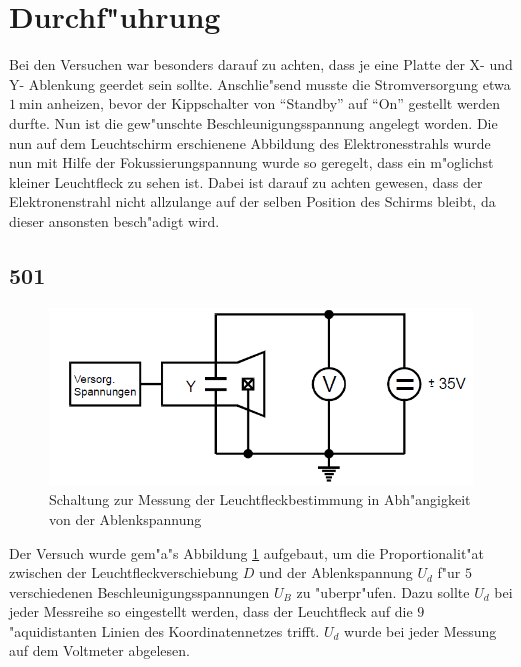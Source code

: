 \section{Durchf"uhrung}
	\label{sec:durchfuehrung}

		Bei den Versuchen war besonders darauf zu achten, dass je eine Platte der X- und Y- Ablenkung geerdet sein sollte. 
		Anschlie"send musste die Stromversorgung etwa $\SI{1}{\minute}$ anheizen, bevor der Kippschalter von "`Standby"' auf "`On"' gestellt werden durfte.
		Nun ist die gew"unschte Be\-schleu\-ni\-gungs\-span\-nun\-g angelegt worden.
		Die nun auf dem Leuchtschirm erschienene Abbildung des Elektronesstrahls wurde nun mit Hilfe der Fokussierungspannung wurde so geregelt, dass ein m"oglichst kleiner Leuchtfleck zu sehen ist.
		Dabei ist darauf zu achten gewesen, dass der Elektronenstrahl nicht allzulange auf der selben Position des Schirms bleibt, da dieser ansonsten besch"adigt wird.

		\subsection{501}
		\label{sub:501}

		\begin{figure}[h]
			\centering
			\includegraphics[width = 14cm]{501a.png}
			\caption{Schaltung zur Messung der Leuchtfleckbestimmung in Abh"angigkeit von der Ablenkspannung}
			\label{501a}
		\end{figure}

		Der Versuch wurde gem"a"s Abbildung \ref{501a} aufgebaut, um die Proportionalit"at zwischen der Leuchtfleckverschiebung $D$ und der Ablenkspannung $U_d$ f"ur $5$ verschiedenen Be\-schleu\-ni\-gungs\-span\-nun\-gen $U_B$ zu "uberpr"ufen. 
		Dazu sollte $U_d$ bei jeder Messreihe so eingestellt werden, dass der Leuchtfleck auf die $9$ "aquidistanten Linien des Koordinatennetzes trifft.
		$U_d$ wurde bei jeder Messung auf dem Voltmeter abgelesen.

